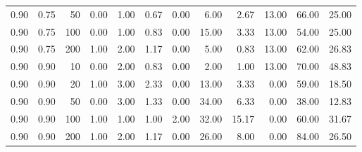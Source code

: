 \documentclass{bmstu}
\begin{document}
\begin{longtable}{|r|r|r|r|r|r|r|r|r|r|r|r|}
0.90 & 0.75 & 50 & 0.00 & 1.00 & 0.67 & 0.00 & 6.00 & 2.67 & 13.00 & 66.00 & 25.00  \\
0.90 & 0.75 & 100 & 0.00 & 1.00 & 0.83 & 0.00 & 15.00 & 3.33 & 13.00 & 54.00 & 25.00  \\
0.90 & 0.75 & 200 & 1.00 & 2.00 & 1.17 & 0.00 & 5.00 & 0.83 & 13.00 & 62.00 & 26.83  \\
\hline
0.90 & 0.90 & 10 & 0.00 & 2.00 & 0.83 & 0.00 & 2.00 & 1.00 & 13.00 & 70.00 & 48.83  \\
0.90 & 0.90 & 20 & 1.00 & 3.00 & 2.33 & 0.00 & 13.00 & 3.33 & 0.00 & 59.00 & 18.50  \\
0.90 & 0.90 & 50 & 0.00 & 3.00 & 1.33 & 0.00 & 34.00 & 6.33 & 0.00 & 38.00 & 12.83  \\
0.90 & 0.90 & 100 & 1.00 & 1.00 & 1.00 & 2.00 & 32.00 & 15.17 & 0.00 & 60.00 & 31.67  \\
0.90 & 0.90 & 200 & 1.00 & 2.00 & 1.17 & 0.00 & 26.00 & 8.00 & 0.00 & 84.00 & 26.50  \\
\hline
\end{longtable}
\end{document}
